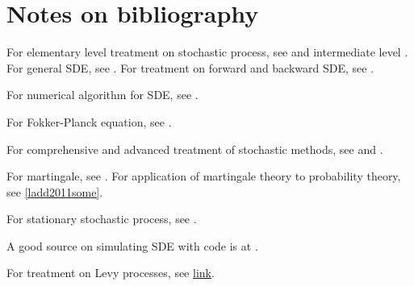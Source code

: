 \begin{refsection}
\begin{definition}
\begin{itemize}
\end{itemize}	

\end{definition}

\section{Notes on bibliography}

For elementary level treatment on stochastic process, see \cite{brzezniak1999basic}\cite{mikosch1998elementary}\cite{wiersema2008brownian} and intermediate level \cite{klebaner2005introduction}.
For general SDE, see \cite{oksendal2013stochastic}\cite{klebaner2005introduction}.
For treatment on forward and backward SDE, see \cite{ma1999forward}.

For numerical algorithm for SDE, see \cite{higham2001algorithmic}.

For Fokker-Planck equation, see \cite{risken2012fokker}.

For comprehensive and advanced treatment of stochastic methods, see \cite{gardiner2009stochastic} and \cite{gardiner1994handbook}.

For martingale, see \cite{ladd2011some}. For application of martingale theory to probability theory, see \autoref{ladd2011some}.



For stationary stochastic process, see \cite{lindgren2012stationary}\cite{lindgren2013stationary}.


A good source on simulating SDE with code is at \cite{iacus2009simulation}.

For treatment on Levy processes, see \cite{schoutens2003levy}\cite{applebaum2009levy}\cite{Manuge2015levy}\cite{tankov2003financial}\href{http://www.applebaum.staff.shef.ac.uk/ovron1.pdf}{link}.
\printbibliography

\end{refsection}



